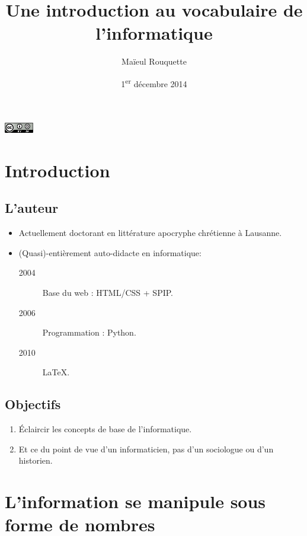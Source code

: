 \documentclass{beamer}
\author{Maïeul Rouquette}
\date{1\textsuperscript{er} décembre 2014}
\title{Une introduction au vocabulaire de l'informatique}
\begin{document}
\begin{slide}
\titlepage

\vfill
\hfill\includegraphics[width=36pt]{cc-by-sa.png}
 \hfill\hbox{}

\end{slide}


\section{Introduction}
\subsection{L'auteur}
\begin{slide}


	\begin{itemize}
		

		\item Actuellement doctorant en littérature apocryphe chrétienne à Lausanne.

		\item (Quasi)-entièrement auto-didacte en informatique:
		
		\begin{description}
			\item[2004] Base du web : HTML/CSS + SPIP.
			\item[2006] Programmation : Python.
			\item[2010] \LaTeX.
		\end{description}
	
	\end{itemize}
\end{slide}

\subsection{Objectifs}

\begin{slide}
	\begin{enumerate}
		\item Éclaircir les concepts de base de l'informatique.
		\item Et ce du point de vue d'un informaticien, pas d'un sociologue ou d'un historien.
	\end{enumerate}
\end{slide}

\section{L'information se manipule sous forme de nombres}
\end{document}
